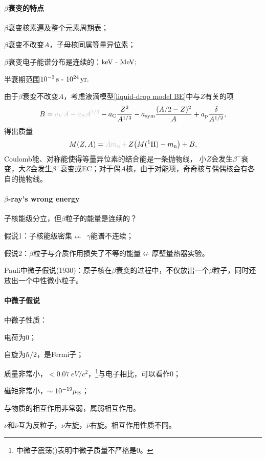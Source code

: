 \paragraph{$\beta$衰变的特点}
\begin{compactenum}
	\item $\beta$衰变核素遍及整个元素周期表；
	\item $\beta$衰变不改变$A$，子母核同属等量异位素；
	\item $\beta$衰变电子能谱分布是连续的：$\si{keV}\vs\si{MeV};$
	\item 半衰期范围$10^{-3}\,\mathrm{s}\vs\SI{e24}{yr}.$
\end{compactenum}
由于$\beta$衰变不改变$A$，考虑液滴模型\eqref{liquid-drop model BE}中与$Z$有关的项
\[
	B=\textcolor{lightgray}{a_VA-a_SA^{2/3}}-a_\mathrm C\frac{Z^2}{A^{1/3}}-a_\mathrm{sym}\frac{(A/2-Z)^2}{A}+a_\mathrm p\frac{\delta}{A^{1/2}},
\]
得出质量
\[
	M(Z,A)=\textcolor{lightgray}{Am_\nton\,+\,}Z\bigkh{M(\nucli1H)-m_\nton}+B,
\]
Coulomb能、对称能使得等量异位素的结合能是一条抛物线，%
小$Z$会发生$\beta^-$衰变，大$Z$会发生$\beta^+$衰变或EC；对于偶$A$核，由于对能项，奇奇核与偶偶核会有各自的抛物线。

\paragraph{$\beta$-ray's wrong energy}子核能级分立，但$\beta$粒子的能量是连续的？
\begin{compactitem}
	\item 假说1：子核能级密集$\nleftarrow$~$\gamma$能谱不连续；
	\item 假说2：$\beta$粒子与介质作用损失了不等的能量$\nleftarrow$厚壁量热器实验。
\end{compactitem}
Pauli中微子假说(1930)：原子核在$\beta$衰变的过程中，不仅放出一个$\beta$粒子，同时还放出一个中性微小粒子。
\paragraph{中微子假说}中微子性质：
\begin{compactenum}
	\item 电荷为0；
	\item 自旋为$\hbar/2$，是Fermi子；
	\item 质量非常小，\href{https://www.sciencedirect.com/topics/chemistry/electron-neutrino}{$<\SI{0.07}{eV}/c^2$}，\footnote{中微子震荡()表明中微子质量不严格是0。}与电子相比，可以看作0；
	\item 磁矩非常小，\href{https://arxiv.org/ftp/arxiv/papers/1506/1506.01284.pdf}{$\sim 10^{-19}\muB$}；
	\item 与物质的相互作用非常弱，属弱相互作用。
\end{compactenum}
$\nu$和$\bar\nu$互为反粒子，$\nu$左旋，$\bar\nu$右旋。相互作用性质不同。


